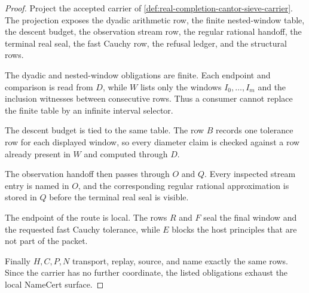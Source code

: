 \begin{proof}
Project the accepted carrier of \autoref{def:real-completion-cantor-sieve-carrier}. The projection exposes the dyadic arithmetic row, the finite nested-window table, the descent budget, the observation stream row, the regular rational handoff, the terminal real seal, the fast Cauchy row, the refusal ledger, and the structural rows.

The dyadic and nested-window obligations are finite. Each endpoint and comparison is read from $D$, while $W$ lists only the windows $I_0,\ldots,I_m$ and the inclusion witnesses between consecutive rows. Thus a consumer cannot replace the finite table by an infinite interval selector.

The descent budget is tied to the same table. The row $B$ records one tolerance row for each displayed window, so every diameter claim is checked against a row already present in $W$ and computed through $D$.

The observation handoff then passes through $O$ and $Q$. Every inspected stream entry is named in $O$, and the corresponding regular rational approximation is stored in $Q$ before the terminal real seal is visible.

The endpoint of the route is local. The rows $R$ and $F$ seal the final window and the requested fast Cauchy tolerance, while $E$ blocks the host principles that are not part of the packet.

Finally $H,C,P,N$ transport, replay, source, and name exactly the same rows. Since the carrier has no further coordinate, the listed obligations exhaust the local NameCert surface.
\end{proof}

